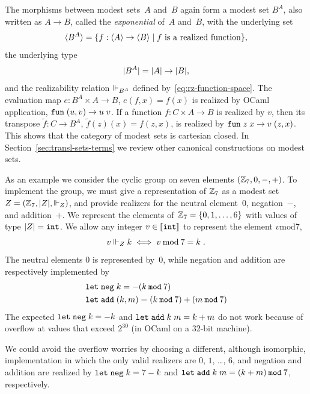 The morphisms between modest sets~$A$ and~$B$ again form a modest set
$B^A$, also written as $A \to B$, called the \emph{exponential} of~$A$
and~$B$, with the underlying set
%
\begin{equation*}
  \langle B^A \rangle =
  \{f : \langle A \rangle \to \langle B \rangle \mid \text{$f$ is a realized function}\},
\end{equation*}
%
the underlying type
%
\begin{equation*}
  |B^A| = |A| \to |B|,
\end{equation*}
%
and the realizability relation $\Vdash_{B^A}$ defined
by~\eqref{eq:rz-function-space}. The evaluation map $e : B^A \times A
\to B$, $e(f,x) = f(x)$ is realized by OCaml application,
$\mathtt{fun}\;(u,v) \to u\;v$. If a function $f : C \times A \to B$ is realized
by $v$, then its transpose $\tilde{f} : C \to B^A$, $\tilde{f}(z)(x) =
f(z,x)$, is realized by $\mathtt{fun}\;z\;x \to v \; (z,x)$. This shows that the
category of modest sets is cartesian closed. In
Section~\ref{sec:transl-sets-terms} we review other canonical
constructions on modest sets.

\bigskip

As an example we consider the cyclic group on seven elements $(\mathbb{Z}_7,
0, {-}, {+})$. To implement the group, we must give a representation
of $\mathbb{Z}_7$ as a modest set~$Z = (\mathbb{Z}_7, |Z|, {\Vdash_Z})$, and
provide realizers for the neutral element~$0$, negation~$-$, and
addition~$+$. We represent the elements of~$\mathbb{Z}_7 = \{0, 1, \ldots,
  6\}$ with values of type $|Z| = \mathtt{int}$. We allow any integer
$v \in [\![\mathtt{int}]\!]$ to represent the element $v
\mathbin{\mathrm{mod}} 7$,
%
\begin{equation*}
  v \Vdash_Z k \iff v \mathbin{\mathrm{mod}} 7 = k \;.
\end{equation*}
%
The neutral elements $0$ is represented by~$0$, while negation and
addition are respectively implemented by
%
\begin{align*}
  &\mathtt{let}\;\mathtt{neg}\; k = -(k \mathbin{\mathtt{mod}} 7) \\
  &\mathtt{let}\;\mathtt{add}\; (k, m) = (k \mathbin{\mathtt{mod}} 7) + (m \mathbin{\mathtt{mod}} 7)
\end{align*}
%
The expected $\mathtt{let}\;\mathtt{neg}\; k = -k$ and $\mathtt{let}\;\mathtt{add}\;
  k\; m = k+m$ do not work because of overflow at values that exceed
$2^{30}$ (in OCaml on a 32-bit machine). 

We could avoid the overflow worries by choosing a different, although
isomorphic, implementation in which the only valid realizers are $0$,
$1$, \ldots, $6$, and negation and addition are realized by
$\mathtt{let}\;\mathtt{neg}\; k = 7 - k$ and $\mathtt{let}\;\mathtt{add}\; k\; m = (k +
  m) \mathbin{\mathtt{mod}} 7$, respectively.

